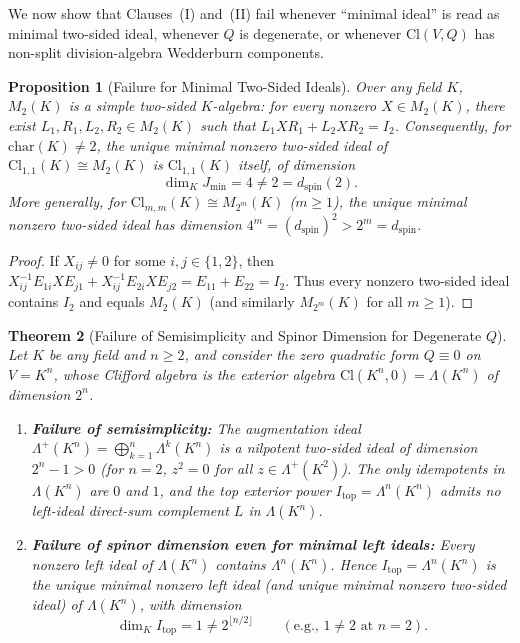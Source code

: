 \documentclass[11pt,a4paper]{article}
\newtheorem{theorem}{Theorem}[section]
\newtheorem{proposition}[theorem]{Proposition}
\theoremstyle{definition}
\newcommand{\Cl}{\mathrm{Cl}}
\begin{document}
We now show that Clauses~(I) and~(II) fail whenever ``minimal ideal'' is read as minimal two-sided ideal, whenever $Q$ is degenerate, or whenever $\Cl(V, Q)$ has non-split division-algebra Wedderburn components.

\begin{proposition}[Failure for Minimal Two-Sided Ideals]\label{prop:twosided}
Over any field $K$, $M_2(K)$ is a simple two-sided $K$-algebra: for every nonzero $X \in M_2(K)$, there exist $L_1, R_1, L_2, R_2 \in M_2(K)$ such that $L_1 X R_1 + L_2 X R_2 = I_2$. Consequently, for $\mathrm{char}(K) \neq 2$, the unique minimal nonzero two-sided ideal of $\Cl_{1,1}(K) \cong M_2(K)$ is $\Cl_{1,1}(K)$ itself, of dimension
\[
  \dim_K J_{\min} = 4 \neq 2 = d_{\mathrm{spin}}(2).
\]
More generally, for $\Cl_{m,m}(K) \cong M_{2^m}(K)$ ($m \ge 1$), the unique minimal nonzero two-sided ideal has dimension $4^m = (d_{\mathrm{spin}})^2 > 2^m = d_{\mathrm{spin}}$.
\end{proposition}

\begin{proof}
If $X_{ij} \neq 0$ for some $i, j \in \{1, 2\}$, then $X_{ij}^{-1} E_{1i} X E_{j1} + X_{ij}^{-1} E_{2i} X E_{j2} = E_{11} + E_{22} = I_2$. Thus every nonzero two-sided ideal contains $I_2$ and equals $M_2(K)$ (and similarly $M_{2^m}(K)$ for all $m \ge 1$).
\end{proof}

\begin{theorem}[Failure of Semisimplicity and Spinor Dimension for Degenerate $Q$]\label{thm:exterior}
Let $K$ be any field and $n \ge 2$, and consider the zero quadratic form $Q \equiv 0$ on $V = K^n$, whose Clifford algebra is the exterior algebra $\Cl(K^n, 0) = \Lambda(K^n)$ of dimension $2^n$.
\begin{enumerate}
  \item[(1)] \textbf{Failure of semisimplicity:} The augmentation ideal $\Lambda^+(K^n) = \bigoplus_{k=1}^n \Lambda^k(K^n)$ is a nilpotent two-sided ideal of dimension $2^n - 1 > 0$ (for $n = 2$, $z^2 = 0$ for all $z \in \Lambda^+(K^2)$). The only idempotents in $\Lambda(K^n)$ are $0$ and $1$, and the top exterior power $I_{\mathrm{top}} = \Lambda^n(K^n)$ admits \emph{no} left-ideal direct-sum complement $L$ in $\Lambda(K^n)$.
  \item[(2)] \textbf{Failure of spinor dimension even for minimal left ideals:} Every nonzero left ideal of $\Lambda(K^n)$ contains $\Lambda^n(K^n)$. Hence $I_{\mathrm{top}} = \Lambda^n(K^n)$ is the \emph{unique} minimal nonzero left ideal (and unique minimal nonzero two-sided ideal) of $\Lambda(K^n)$, with dimension
  \[
    \dim_K I_{\mathrm{top}} = 1 \neq 2^{\lfloor n/2 \rfloor} \qquad (\text{e.g., } 1 \neq 2 \text{ at } n = 2).
  \]
\end{enumerate}
\end{theorem}
\end{document}
